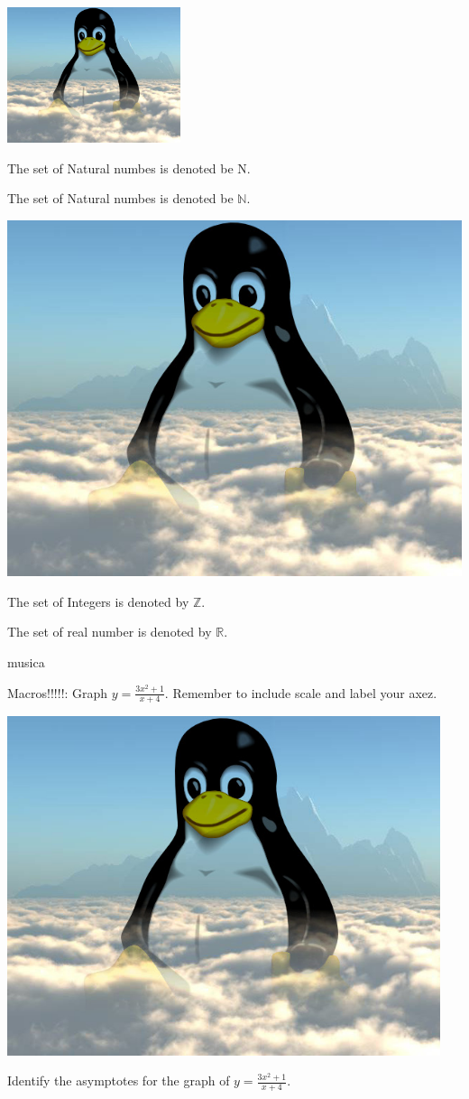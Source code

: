 \documentclass[11]{article}
\def\eq1{y=\frac{3x^2+1}{x+4}}
\def\labelaxes{Remember to include scale and label your axez.}
\begin{document}
\begin{center}
\includegraphics[width=2in,angle=45]{img1.jpg}
\end{center}


The set of Natural numbes is denoted be N.

The set of Natural numbes is denoted be $\mathbb{N}$.

\begin{center}
\includegraphics[scale=0.5]{img1.jpg}
\end{center}

The set of Integers is denoted by $\mathbb{Z}$.

The set of real number is denoted by $\mathbb{R}$.

 musica
 

Macros!!!!!:
Graph $\eq1$. \labelaxes

\includegraphics[width=5in]{img1.jpg}



Identify the asymptotes for the graph of $\eq1$.
\end{document}
